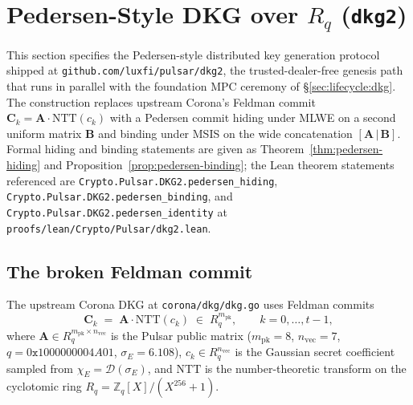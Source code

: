 \section{Pedersen-Style DKG over $R_q$ (\texttt{dkg2})}
\label{sec:pedersen-dkg}

This section specifies the Pedersen-style distributed key generation
protocol shipped at \texttt{github.com/luxfi/pulsar/dkg2}, the
trusted-dealer-free genesis path that runs in parallel with the
foundation MPC ceremony of \S\ref{sec:lifecycle:dkg}. The construction
replaces upstream Corona's Feldman commit
$\mathbf{C}_k = \mathbf{A}\cdot\mathrm{NTT}(c_k)$ with a Pedersen
commit hiding under MLWE on a second uniform matrix $\mathbf{B}$ and
binding under MSIS on the wide concatenation
$[\mathbf{A}\,|\,\mathbf{B}]$. Formal hiding and binding statements are
given as Theorem~\ref{thm:pedersen-hiding} and
Proposition~\ref{prop:pedersen-binding}; the Lean theorem statements
referenced are
\texttt{Crypto.Pulsar.DKG2.pedersen\_hiding},
\texttt{Crypto.Pulsar.DKG2.pedersen\_binding}, and
\texttt{Crypto.Pulsar.DKG2.pedersen\_identity} at
\texttt{proofs/lean/Crypto/Pulsar/dkg2.lean}.

\subsection{The broken Feldman commit}
\label{ssec:dkg-broken}

The upstream Corona DKG at \texttt{corona/dkg/dkg.go} uses Feldman
commits
\begin{equation}
\label{eq:feldman-broken}
\mathbf{C}_k \;=\; \mathbf{A}\cdot\mathrm{NTT}(c_k) \;\in\; R_q^{m_{\textrm{pk}}},
\qquad k = 0,\dots,t-1,
\end{equation}
where $\mathbf{A} \in R_q^{m_{\textrm{pk}} \times n_{\textrm{vec}}}$ is
the Pulsar public matrix
($m_{\textrm{pk}} = 8$, $n_{\textrm{vec}} = 7$,
$q = 0\mathtt{x}1000000004A01$, $\sigma_E = 6.108$),
$c_k \in R_q^{n_{\textrm{vec}}}$ is the Gaussian secret coefficient
sampled from $\chi_E = \mathcal{D}(\sigma_E)$, and $\mathrm{NTT}$ is the
number-theoretic transform on the cyclotomic ring $R_q = \mathbb{Z}_q[X]/(X^{256}+1)$.

